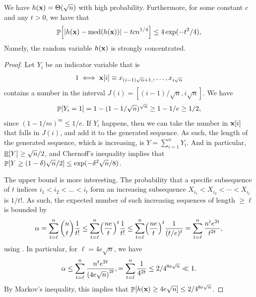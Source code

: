 \begin{lemma}
    We have $h(\mathbf{x}) =\Theta(\sqrt{n})$ with high
    probability. Furthermore, for some constant $c$ and any $t > 0$,
    we have that
    \begin{equation*} 
        \Prob{\bigl. \cardin{ h(\vecX) - \medX{h(\vecX)}} - t
           cn^{1/4}} \leq%
        4 \exp(-t^2/4),
    \end{equation*}
    Namely, the random variable $h(\mathbf{x})$ is strongly concentrated.
\end{lemma}
\begin{proof}
    Let $Y_i$ be an indicator variable that is
    \begin{equation*}
        1 \iff
        \mathbf{x}[i] \equiv x_{(i-1)\sqrt{n}+ 1,}, \ldots, x_{i\sqrt{n}}
    \end{equation*}
    contains a number in the interval
    $J(i) = [(i-1)/\sqrt{n}, i\sqrt{n}]$. We have
    \begin{equation*}
        \Prob{Y_i=1}%
        =%
        1 - (1-1/\sqrt{n})^{\sqrt{n}} \geq 1-1/e \geq 1/2,
    \end{equation*}
    since $(1-1/m)^m \leq 1/e$. If $Y_i$ happens, then we can take the
    number in $\mathbf{x}[i]$ that falls in $J(i)$, and add it to the
    generated sequence. As such, the length of the generated sequence,
    which is increasing, is $Y=\sum_{i=1}^n Y_i$. And in particular,
    $\mathop{\mathbb{E}}\!\left[ {Y} \right] \geq \sqrt{n}/2$, and Chernoff's inequality implies that
    $\Prob{Y \geq (1-\delta)\sqrt{n}/2} \leq \exp( - \delta^2
    \sqrt{n}/8 )$.

    The upper bound is more interesting. The probability that a
    specific subsequence of $t$ indices $i_1 < i_2 < \ldots <i_t$ form
    an increasing subsequence $X_{i_1} < X_{i_2} < \cdots < X_{i_t}$
    is $1/t!$. As such, the expected number of such increasing
    sequences of length $\geq \ell$ is bounded by
    \begin{equation*}
        \alpha %
        =%
        \sum_{t=\ell}^n \binom{n}{t} \frac{1}{t!}%
        \leq%
        \sum_{t=\ell}^n \pth{\frac{n e}{t}}^t \frac{1}{t!}
        \leq%
        \sum_{t=\ell}^n \pth{\frac{n e}{t}}^t \frac{1}{(t/e)^t}
        = %
        \sum_{t=\ell}^n \frac{n^t e^{2t}}{t^{2t}},
    \end{equation*}
    using . In particular, for $\ell =
    4e \sqrt{n}$, we have
    \begin{equation*}
        \alpha %
        \leq %
        \sum_{t=\ell}^n \frac{n^t e^{2t}}{\pth{4 e \sqrt{n}}^{2t}},
        =%
        \sum_{t=\ell}^n \frac{1}{4^{2t}}%
        \leq%
        2 / 4^{8e\sqrt{n}}%
        \ll%
        1.%
    \end{equation*}
    By Markov's inequality, this implies that
    $\Prob{h(\vecX) \geq 4e \sqrt{n}} \leq 2 / 4^{8e\sqrt{n}}$. %


\end{proof}
